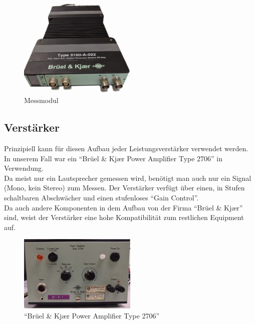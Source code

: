 \begin{figure} [H]
	\centering
	\includegraphics[width=0.5\textwidth]{img/LSMessung/modul_front.png}
	\caption{Messmodul}
	\label{fig:5.2.2.2}
\end{figure}

\newpage
\subsection*{Verstärker}\label{subsec:5.2.3}
Prinzipiell kann für diesen Aufbau jeder Leistungsverstärker verwendet werden. In unserem Fall war ein \enquote{Brüel \& Kj\ae r Power Amplifier Type 2706} in Verwendung.\\
Da meist nur ein Lautsprecher gemessen wird, benötigt man auch nur ein Signal (Mono, kein Stereo) zum Messen. Der Verstärker verfügt über einen, in Stufen schaltbaren Abschwächer und einen stufenloses \enquote{Gain Control}.\\
Da auch andere Komponenten in dem Aufbau von der Firma  \enquote{Brüel \& Kj\ae r} sind, weist der Verstärker eine hohe Kompatibilität zum restlichen Equipment auf.
\begin{figure} [H]
	\centering
	\includegraphics[width=0.5\textwidth]{img/LSMessung/verstaerker1.png}
	\caption{\enquote{Brüel \& Kj\ae r Power Amplifier Type 2706}}
	\label{fig:5.2.3.1}
\end{figure}

